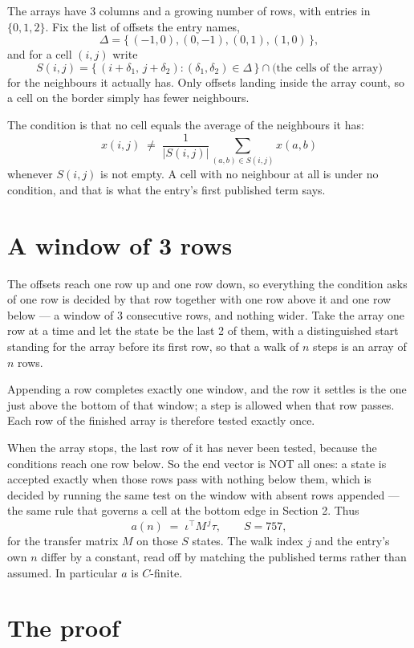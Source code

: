 \documentclass[11pt,a4paper]{article}
\theoremstyle{plain}
\theoremstyle{definition}
\begin{document}
The arrays have $3$ columns and a growing number of rows, with entries in $\{0,1,2\}$. Fix the
list of offsets the entry names,
\[
\Delta=\{\,(-1,0), (0,-1), (0,1), (1,0)\,\},
\]
and for a cell $(i,j)$ write
\[
S(i,j)=\{\,(i+\delta_1,\,j+\delta_2) : (\delta_1,\delta_2)\in\Delta\,\}\cap
\text{(the cells of the array)}
\]
for the neighbours it actually has. Only offsets landing inside the array count, so a cell on
the border simply has fewer neighbours.

The condition is that no cell equals the average of the neighbours it has:
\[
x(i,j)\;\neq\;\frac{1}{|S(i,j)|}\sum_{(a,b)\in S(i,j)}x(a,b)
\]
whenever $S(i,j)$ is not empty. A cell with no neighbour at all is under no condition, and that is what the entry's first published term says.

\section{A window of 3 rows}

The offsets reach one row up and one row down, so everything the condition asks of one row is
decided by that row together with one row above it and one row below --- a window of
$3$ consecutive rows, and nothing wider. Take the array one row at a time
and let the state be the last 2 of them, with a distinguished start standing for the
array before its first row, so that a walk of $n$ steps is an array of $n$ rows.

Appending a row completes exactly one window, and the row it settles is the one just above the bottom of that window; a step is
allowed when that row passes. Each row of the finished
array is therefore tested exactly once.

When the array stops, the last row of it has never been tested, because the
conditions reach one row below. So the end vector is NOT all ones: a state is accepted exactly when
those rows pass with nothing below them, which is decided by running the same test on the window
with absent rows appended --- the same rule that governs a cell at the bottom edge in
Section 2.
Thus
\[
a(n)\;=\;\iota^{\!\top}M^{\,j}\tau ,\qquad S=757,
\]
for the transfer matrix $M$ on those $S$ states. The walk index $j$ and the entry's own $n$
differ by a constant, read off by matching the published terms rather than assumed. In
particular $a$ is $C$-finite.

\section{The proof}
\end{document}
